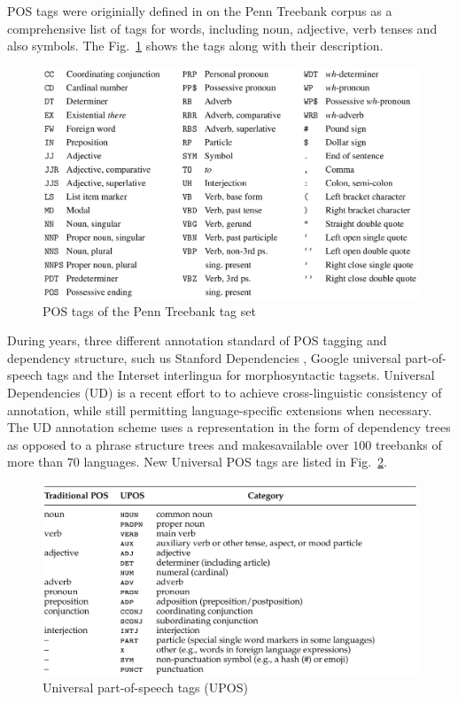 POS tags were originially defined in \cite{marcus1993building} on the
Penn Treebank corpus as a comprehensive list of tags for words,
including noun, adjective, verb tenses and also symbols. The
Fig.~\ref{fig:pos-tags} shows the tags along with their description.

\begin{figure}
  \centering
  \includegraphics[width=.8\textwidth]{figures/pos-tags.png}
  \caption[POS tags]{POS tags of the Penn Treebank tag set \cite{marcus1993building}}
  \label{fig:pos-tags}
\end{figure}

During years, three different annotation standard of POS tagging and
dependency structure, such us Stanford Dependencies
\cite{de2006generating, de2008stanford, silveira2014gold}, Google
universal part-of-speech tags \cite{lin2012syntactic} and the Interset
interlingua \cite{zeman2008reusable} for morphosyntactic tagsets.
Universal Dependencies (UD) \cite{nivre2016universal,
nivre2017universal} is a recent effort to to achieve cross-linguistic
consistency of annotation, while still permitting language-specific
extensions when necessary. The UD annotation scheme uses a
representation in the form of dependency trees as opposed to a phrase
structure trees and makesavailable over $100$ treebanks of more than
$70$ languages. New Universal POS tags are listed in
Fig.~\ref{fig:upos-tags}.

\begin{figure}
  \centering
  \includegraphics[width=.8\textwidth]{figures/upos-tags.png}
  \caption[Universal POS tags]{Universal part-of-speech tags (UPOS) \cite{nivre2017universal}}
  \label{fig:upos-tags}
\end{figure}
 
